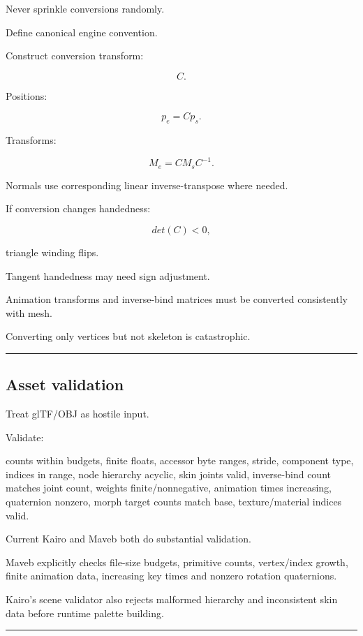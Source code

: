 Never sprinkle conversions randomly.

Define canonical engine convention.

Construct conversion transform:

\[
C.
\]

Positions:

\[
p_e=
Cp_s.
\]

Transforms:

\[
\boxed{
M_e=
CM_sC^{-1}.
}
\]

Normals use corresponding linear inverse-transpose where needed.

If conversion changes handedness:

\[
det(C)<0,
\]

triangle winding flips.

Tangent handedness may need sign adjustment.

Animation transforms and inverse-bind matrices must be converted consistently with mesh.

Converting only vertices but not skeleton is catastrophic.

\begin{center}\rule{0.5\linewidth}{0.5pt}\end{center}

\subsection{Asset validation}\label{04-visual-computing-ii-ch041-asset-validation}

Treat glTF/OBJ as hostile input.

Validate:

counts within budgets, finite floats, accessor byte ranges, stride, component type, indices in range, node hierarchy acyclic, skin joints valid, inverse-bind count matches joint count, weights finite/nonnegative, animation times increasing, quaternion nonzero, morph target counts match base, texture/material indices valid.

Current Kairo and Maveb both do substantial validation.

Maveb explicitly checks file-size budgets, primitive counts, vertex/index growth, finite animation data, increasing key times and nonzero rotation quaternions.

Kairo's scene validator also rejects malformed hierarchy and inconsistent skin data before runtime palette building.

\begin{center}\rule{0.5\linewidth}{0.5pt}\end{center}

